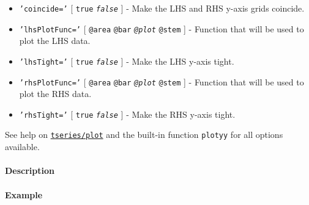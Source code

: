 \begin{itemize}
\item
  \texttt{'coincide='} {[} \texttt{true} \textbar{}
  \emph{\texttt{false}} {]} - Make the LHS and RHS y-axis grids
  coincide.
\item
  \texttt{'lhsPlotFunc='} {[} \texttt{@area} \textbar{} \texttt{@bar}
  \textbar{} \emph{\texttt{@plot}} \textbar{} \texttt{@stem} {]} -
  Function that will be used to plot the LHS data.
\item
  \texttt{'lhsTight='} {[} \texttt{true} \textbar{}
  \emph{\texttt{false}} {]} - Make the LHS y-axis tight.
\item
  \texttt{'rhsPlotFunc='} {[} \texttt{@area} \textbar{} \texttt{@bar}
  \textbar{} \emph{\texttt{@plot}} \textbar{} \texttt{@stem} {]} -
  Function that will be used to plot the RHS data.
\item
  \texttt{'rhsTight='} {[} \texttt{true} \textbar{}
  \emph{\texttt{false}} {]} - Make the RHS y-axis tight.
\end{itemize}

See help on \href{tseries/plot}{\texttt{tseries/plot}} and the built-in
function \texttt{plotyy} for all options available.

\paragraph{Description}

\paragraph{Example}


